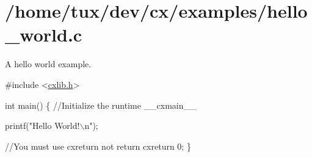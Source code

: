 \hypertarget{a00080}{}\section{/home/tux/dev/cx/examples/hello\+\_\+world.\+c}
A hello world example.


\begin{DoxyCodeInclude}

\textcolor{preprocessor}{#include <\hyperlink{a00014}{cxlib.h}>}

\textcolor{keywordtype}{int} main()
\{
    \textcolor{comment}{//Initialize the runtime}
    \_\_cxmain\_\_

    printf(\textcolor{stringliteral}{"Hello World!\(\backslash\)n"});

    \textcolor{comment}{//You must use cxreturn not return}
    cxreturn 0;
\}
\end{DoxyCodeInclude}
 